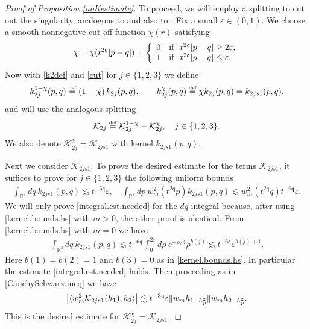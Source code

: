 \documentclass[reqno]{amsart}
\newcommand{\eqdef }{\overset{\mbox{\tiny{def}}}{=}}
\newcommand{\pv}{p}
\newcommand{\qv}{q}
\newcommand{\threed}{{\mathbb R}^3}
\newcommand{\qq}{\mathfrak{q}}
\newcommand{\tqq}{t^{2\qq}}
\newcommand{\tmQq}{t^{-6\qq}}
\newcommand{\tmTq}{t^{-3\qq}}
\newcommand{\compK}{\mathcal{K}}
\newcommand{\smep}{\varepsilon}
\theoremstyle{definition}
\numberwithin{equation}{section}
\numberwithin{theorem}{section}
\begin{document}
\begin{proof}[Proof of Proposition \ref{noKestimate}]
To proceed, we will employ a splitting to cut out the singularity, analogous to \cite[Equation (3.1)]{MR2728733} and also to \cite{MR2366140}. Fix a small $\smep\in(0,1)$.  We choose a smooth nonnegative cut-off function $\chi (r)$ satisfying
\begin{equation}
\chi=\chi (\tqq|\pv - \qv|)=
\left\{
\begin{array}{cl}
 0 & {\rm if } ~~  \tqq|\pv - \qv| \ge 2\smep,
 \\
  1 &
  {\rm if } ~~ \tqq|\pv - \qv| \leq \smep.
\end{array}
\right.
\label{cut}
\end{equation}
Now with \eqref{k2def} and \eqref{cut} for $j \in \{1, 2, 3\}$ we define
\begin{align}\label{kCUT}
    k_{2j}^{1-\chi}(p,q) \eqdef  \left( 1 - \chi \right)k_{2j}(p,q), 
    \qquad 
    k_{2j}^{\chi}(p,q)\eqdef   \chi k_{2j}(p,q)=k_{2js1}(p,q),
\end{align}
and will use the analogous splitting
$$
\compK_{2j}
\eqdef
\compK_{2j}^{1-\chi}
+
\compK_{2j}^{\chi}, \quad j \in \{1, 2, 3\}.
$$
We also denote $\compK_{2j}^{\chi}=\compK_{2js1}$ with kernel $k_{2js1}(p,q)$.



Next we consider $\compK_{2js1}$. To prove the desired estimate for the terms $\compK_{2js1}$, it suffices to prove for $j \in \{1, 2, 3\}$ the following uniform bounds
\begin{align}\label{integral.est.needed}
  \int_{\threed} dq~ k_{2js1}(p,q)\lesssim 
  \tmQq  \smep,
 \quad\int_{\threed} d\pv~ w_{m}^2(\tqq \pv)k_{2js1}(p,q)  \lesssim 
  w_{m}^2(\tqq \qv)\tmQq  \smep. 
\end{align}
We will only prove \eqref{integral.est.needed} for the $d\qv$ integral because, after using \eqref{kernel.bounds.hs} with $m>0$, the other proof is identical.  
From \eqref{kernel.bounds.hs} with $m=0$ we have 
\begin{align*}
    \int_{\threed} d\qv~ k_{2js1}(p,q)
    \lesssim \tmQq\int_0^{2\smep} d\rho ~ e^{- \rho/4} \rho^{b(j)}
    \lesssim \tmQq \smep^{b(j)+1}.
\end{align*}
Here $b(1) =b(2) = 1$ and  $b(3) = 0$ as in \eqref{kernel.bounds.hs}.  In particular the estimate \eqref{integral.est.needed} holds.  Then proceeding as in \eqref{CauchySchwarz.ineq} we have
\begin{align}\notag
\left|
\langle  w_{m}^2 \compK_{2js1}(h_1), h_2\rangle 
\right|
\lesssim   
\tmTq \smep \| w_{m} h_1\|_{L^2_p}
 \|  w_{m} h_2\|_{L^2_p}.
\end{align}
This is the desired estimate for $\compK_{2j}^{\chi}=\compK_{2js1}$.




\end{proof}
\end{document}
